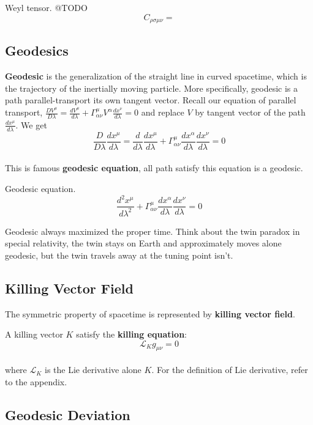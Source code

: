 \documentclass[12pt]{article}
\theoremstyle{mystyle}{\newtheorem{definition}{Definition}[section]}
\theoremstyle{mystyle}{\newtheorem{theorem}[definition]{Theorem}}
\theoremstyle{mystyle}{\newtheorem*{remark}{Remark}}
\theoremstyle{mystyle}{\newtheorem*{example}{Example}}
\theoremstyle{mystyle}{\newtheorem*{examples}{Examples}}
\theoremstyle{cstyle}{\newtheorem*{cthm}{}}
\begin{document}
\begin{definition}
  Weyl tensor. @TODO
  \[C_{\rho\sigma\mu\nu} = \]
\end{definition}
\subsection{Geodesics}

\textbf{Geodesic} is the generalization of the straight line in curved spacetime, which is the trajectory of the inertially moving particle.
More specifically, geodesic is a path parallel-transport its own tangent vector.
Recall our equation of parallel transport, \(\frac{DV^{\mu}}{D\lambda} =
\frac{dV^{\mu}}{d\lambda}+ \Gamma^{\mu}_{\alpha\nu}V^{\alpha}\frac{dx^{\nu}}{d\lambda} = 0\) and replace \(V\)
by tangent vector of the path \(\frac{dx^{\mu}}{d\lambda}\). We get
\[\frac{D}{D\lambda}\frac{dx^{\mu}}{d\lambda} =
  \frac{d}{d\lambda}\frac{dx^{\mu}}{d\lambda}+ \Gamma^{\mu}_{\alpha\nu}\frac{dx^{\alpha}}{d\lambda}\frac{dx^{\nu}}{d\lambda} = 0\]\\
This is famous \textbf{geodesic equation}, all path satisfy this equation is a geodesic.

\begin{definition}
  Geodesic equation.
  \[\frac{d^2 x^{\mu}}{d\lambda^2}+ \Gamma^{\mu}_{\alpha\nu}\frac{dx^{\alpha}}{d\lambda}\frac{dx^{\nu}}{d\lambda} = 0\]
\end{definition}

Geodesic always maximized the proper time. Think about the twin paradox in special relativity, the twin stays on Earth and approximately moves alone geodesic,
but the twin travels away at the tuning point isn't.

\subsection{Killing Vector Field}
The symmetric property of spacetime is represented by \textbf{killing vector field}.
\begin{definition}
  A killing vector \(K\) satisfy the \textbf{killing equation}:
  \[\mathcal{L}_{K}g_{\mu\nu}= 0\]\\
  where \(\mathcal{L}_{K}\) is the Lie derivative alone \(K\). For the definition of Lie derivative, refer to the appendix.
\end{definition}


\subsection{Geodesic Deviation}
\end{document}

